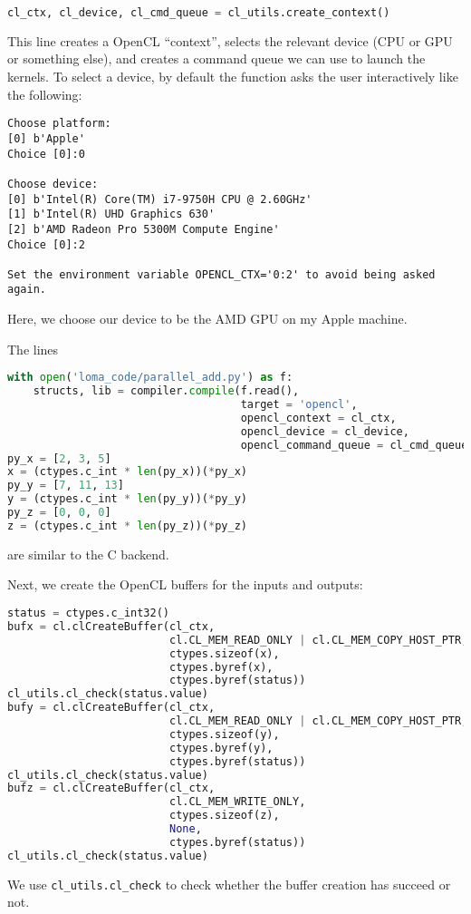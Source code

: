 \begin{lstlisting}[language=python]
cl_ctx, cl_device, cl_cmd_queue = cl_utils.create_context()
\end{lstlisting}
This line creates a OpenCL ``context'', selects the relevant device (CPU or GPU or something else), and creates a command queue we can use to launch the kernels. To select a device, by default the function asks the user interactively like the following:
\begin{lstlisting}
Choose platform:
[0] b'Apple'
Choice [0]:0

Choose device:
[0] b'Intel(R) Core(TM) i7-9750H CPU @ 2.60GHz'
[1] b'Intel(R) UHD Graphics 630'
[2] b'AMD Radeon Pro 5300M Compute Engine'
Choice [0]:2

Set the environment variable OPENCL_CTX='0:2' to avoid being asked again.
\end{lstlisting}
Here, we choose our device to be the AMD GPU on my Apple machine.

The lines 
\begin{lstlisting}[language=python]
with open('loma_code/parallel_add.py') as f:
    structs, lib = compiler.compile(f.read(),
                                    target = 'opencl',
                                    opencl_context = cl_ctx,
                                    opencl_device = cl_device,
                                    opencl_command_queue = cl_cmd_queue)
py_x = [2, 3, 5]
x = (ctypes.c_int * len(py_x))(*py_x)
py_y = [7, 11, 13]
y = (ctypes.c_int * len(py_y))(*py_y)
py_z = [0, 0, 0]
z = (ctypes.c_int * len(py_z))(*py_z)
\end{lstlisting}
are similar to the C backend.

Next, we create the OpenCL buffers for the inputs and outputs:
\begin{lstlisting}[language=python]
status = ctypes.c_int32()
bufx = cl.clCreateBuffer(cl_ctx,
                         cl.CL_MEM_READ_ONLY | cl.CL_MEM_COPY_HOST_PTR,
                         ctypes.sizeof(x),
                         ctypes.byref(x),
                         ctypes.byref(status))
cl_utils.cl_check(status.value)
bufy = cl.clCreateBuffer(cl_ctx,
                         cl.CL_MEM_READ_ONLY | cl.CL_MEM_COPY_HOST_PTR,
                         ctypes.sizeof(y),
                         ctypes.byref(y),
                         ctypes.byref(status))
cl_utils.cl_check(status.value)
bufz = cl.clCreateBuffer(cl_ctx,
                         cl.CL_MEM_WRITE_ONLY,
                         ctypes.sizeof(z),
                         None,
                         ctypes.byref(status))
cl_utils.cl_check(status.value)
\end{lstlisting}
We use \lstinline{cl_utils.cl_check} to check whether the buffer creation has succeed or not.

